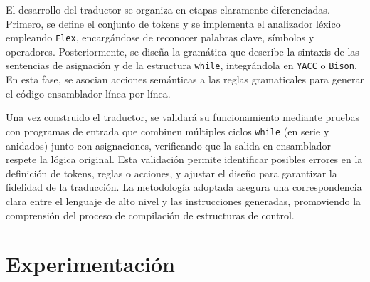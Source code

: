 \documentclass{article}
\begin{document}
El desarrollo del traductor se organiza en etapas claramente diferenciadas. Primero, se define el conjunto de tokens y se implementa el analizador léxico empleando \texttt{Flex}, encargándose de reconocer palabras clave, símbolos y operadores. Posteriormente, se diseña la gramática que describe la sintaxis de las sentencias de asignación y de la estructura \texttt{while}, integrándola en \texttt{YACC} o \texttt{Bison}. En esta fase, se asocian acciones semánticas a las reglas gramaticales para generar el código ensamblador línea por línea.

Una vez construido el traductor, se validará su funcionamiento mediante pruebas con programas de entrada que combinen múltiples ciclos \texttt{while} (en serie y anidados) junto con asignaciones, verificando que la salida en ensamblador respete la lógica original. Esta validación permite identificar posibles errores en la definición de tokens, reglas o acciones, y ajustar el diseño para garantizar la fidelidad de la traducción. La metodología adoptada asegura una correspondencia clara entre el lenguaje de alto nivel y las instrucciones generadas, promoviendo la comprensión del proceso de compilación de estructuras de control.










\section{Experimentación}\label{sec:exp}
\end{document}
